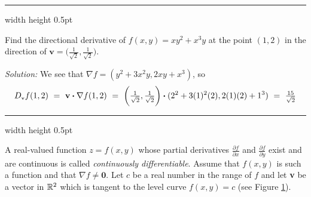 \vspace{-4mm}

\hrule width \textwidth height 0.5pt
\begin{exmp}
 Find the directional derivative of $f(x,y) = xy^2 + x^3 y$ at the point $(1,2)$ in the direction of
 $\textbf{v} = \biggl( \frac{1}{\sqrt{2}},\frac{1}{\sqrt{2}} \biggr)$.\vspace{1mm}
 \par\noindent\emph{Solution:} We see that $\nabla f = (y^2 + 3x^2 y, 2xy + x^3)$, so\index{$\nabla$}
 \begin{displaymath}
  D_{\scriptscriptstyle \textbf{v}}f(1,2) ~=~ \textbf{v} \bm{\cdot} \nabla f(1,2)
   ~=~ \biggl( \tfrac{1}{\sqrt{2}},\tfrac{1}{\sqrt{2}} \biggr) \bm{\cdot} (2^2 + 3(1)^2 (2),2(1)(2)+1^3)
   ~=~ \tfrac{15}{\sqrt{2}}
 \end{displaymath}
\end{exmp}\vspace{-1mm}
\hrule width \textwidth height 0.5pt
\vspace{3mm}

A real-valued function $z=f(x,y)$ whose partial derivatives $\tfrac{\partial f}{\partial x}$ and
$\frac{\partial f}{\partial y}$ exist and are continuous is called \emph{continuously differentiable}.
Assume that $f(x,y)$ is such a function and that $\nabla f \ne \textbf{0}$. 
Let $c$ be a real number in the range of
$f$ and let \textbf{v} be a vector in $\mathbb{R}^{2}$ which is tangent to the
level curve $f(x,y) = c$ (see Figure \ref{fig:gradlevel}).\vspace{-1mm}
\begin{figure}[h]
 \begin{center}
  \vspace{-4mm}
 \end{center}
 \caption[]{}
 \label{fig:gradlevel}
\end{figure}\vspace{-2mm}

